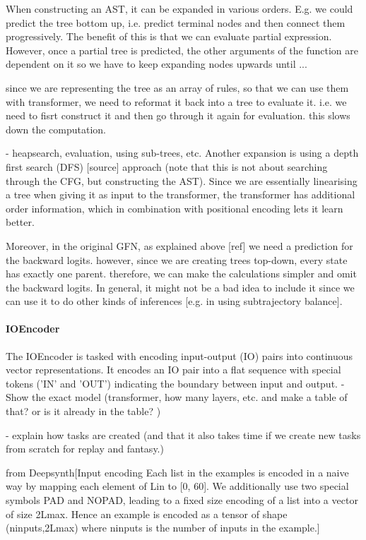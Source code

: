 When constructing an AST, it can be expanded in various orders.
E.g. we could predict the tree bottom up, i.e. predict terminal nodes and then connect them progressively. The benefit of this is that we can evaluate partial expression. However, once a partial tree is predicted, the other arguments of the function are dependent on it so we have to keep expanding nodes upwards until ...

since we are representing the tree as an array of rules, so that we can use them with transformer, we need to reformat it back into a tree to evaluate it. i.e. we need to fisrt construct it and then go through it again for evaluation. this slows down the computation. 

- heapsearch, evaluation, using sub-trees, etc. 
Another expansion is using a depth first search (DFS) [source] approach (note that this is not about searching through the CFG, but constructing the AST). Since we are essentially linearising a tree when giving it as input to the transformer, the transformer has additional order information, which in combination with positional encoding lets it learn better. 

Moreover, in the original GFN, as explained above [ref] we need a prediction for the backward logits. however, since we are creating trees top-down, every state has exactly one parent. therefore, we can make the calculations simpler and omit the backward logits. 
In general, it might not be a bad idea to include it since we can use it to do other kinds of inferences [e.g. in using subtrajectory balance].


\paragraph{IOEncoder}
The IOEncoder is tasked with encoding input-output (IO) pairs into continuous vector representations.
It encodes an IO pair into a flat sequence with special tokens ('IN' and 'OUT') indicating the boundary between input and output.
- Show the exact model (transformer, how many layers, etc. and make a table of that? or is it already in the table? )

- explain how tasks are created (and that it also takes time if we create new tasks from scratch for replay and fantasy.)

from Deepsynth[Input encoding Each list in the examples is encoded in a naive way by mapping each element of Lin to [0, 60]. We additionally use two special symbols PAD and NOPAD, leading to a fixed size encoding of a list into a vector of size 2Lmax. Hence an example is encoded as a tensor of shape (ninputs,2Lmax) where ninputs is the number of inputs in the example.]

